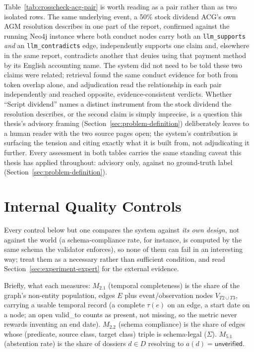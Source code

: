 \documentclass[fontsize=12pt,oneside,headings=small]{scrreprt}
\begin{document}
Table~\ref{tab:crosscheck-acg-pair} is worth reading as a pair rather than as two isolated rows. The same underlying event, a 50\% stock dividend ACG's own AGM resolution describes in one part of the report, confirmed against the running Neo4j instance where both conduct nodes carry both an \texttt{llm\_supports} \emph{and} an \texttt{llm\_contradicts} edge, independently supports one claim and, elsewhere in the same report, contradicts another that denies using that payment method by its English accounting name. The system did not need to be told these two claims were related; retrieval found the same conduct evidence for both from token overlap alone, and adjudication read the relationship in each pair independently and reached opposite, evidence-consistent verdicts. Whether ``Script dividend'' names a distinct instrument from the stock dividend the resolution describes, or the second claim is simply imprecise, is a question this thesis's advisory framing (Section~\ref{sec:problem-definition}) deliberately leaves to a human reader with the two source pages open; the system's contribution is surfacing the tension and citing exactly what it is built from, not adjudicating it further. Every assessment in both tables carries the same standing caveat this thesis has applied throughout: advisory only, against no ground-truth label (Section~\ref{sec:problem-definition}).

\section{Internal Quality Controls}
\label{sec:experiment-internal}

Every control below but one compares the system against \textit{its own design}, not against the world (a schema-compliance rate, for instance, is computed by the same schema the validator enforces), so none of them can fail in an interesting way; treat them as a necessary rather than sufficient condition, and read Section~\ref{sec:experiment-expert} for the external evidence.

Briefly, what each measures: $M_{2.1}$ (temporal completeness) is the share of the graph's non-entity population, edges $E$ plus event/observation nodes $V_{T2\cup T3}$, carrying a usable temporal record (a complete $\tau(e)$ on an edge, a start date on a node; an open \textsf{valid\_to} counts as present, not missing, so the metric never rewards inventing an end date). $M_{2.2}$ (schema compliance) is the share of edges whose (predicate, source class, target class) triple is schema-legal ($\Sigma$). $M_{5.1}$ (abstention rate) is the share of dossiers $d \in D$ resolving to $a(d)=\textsf{unverified}$.
\end{document}
